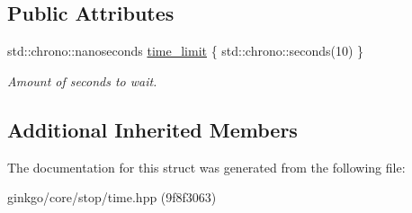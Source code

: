 \subsection*{Public Attributes}
\begin{DoxyCompactItemize}
\item 
\mbox{\label{structgko_1_1stop_1_1Time_1_1parameters__type_aee1d09b9ec4e73561e46e94888cf885a}} 
std\+::chrono\+::nanoseconds \hyperlink{structgko_1_1stop_1_1Time_1_1parameters__type_aee1d09b9ec4e73561e46e94888cf885a}{time\+\_\+limit} \{ std\+::chrono\+::seconds(10) \}
\begin{DoxyCompactList}\small\item\em Amount of seconds to wait. \end{DoxyCompactList}\end{DoxyCompactItemize}
\subsection*{Additional Inherited Members}


The documentation for this struct was generated from the following file\+:\begin{DoxyCompactItemize}
\item 
ginkgo/core/stop/time.\+hpp (9f8f3063)\end{DoxyCompactItemize}
